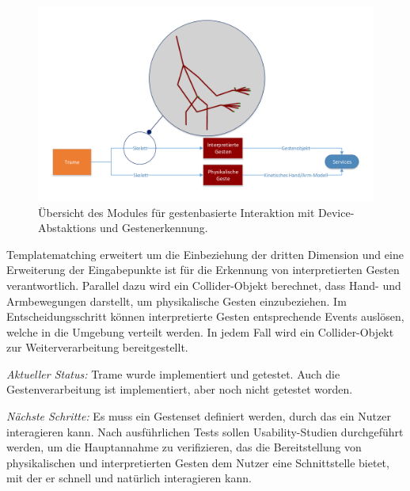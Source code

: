 \begin{figure}[H]
\includegraphics[width=\columnwidth]{figs/gesture_recognition_pipeline}
\caption{Übersicht des Modules für gestenbasierte Interaktion mit Device-Abstaktions und Gestenerkennung.}
\label{fig:gesture_recognition}
\end{figure}

Templatematching\cite{Kristensson:2012:CRO:2166966.2166983} erweitert um die Einbeziehung der dritten Dimension und eine
Erweiterung der Eingabepunkte ist für die Erkennung von interpretierten Gesten verantwortlich. Parallel dazu wird ein
Collider-Objekt berechnet, dass Hand- und Armbewegungen darstellt, um physikalische Gesten einzubeziehen. Im 
Entscheidungsschritt können interpretierte Gesten entsprechende Events auslösen, welche in die Umgebung verteilt werden.
In jedem Fall wird ein Collider-Objekt zur Weiterverarbeitung bereitgestellt. 


{\em Aktueller Status:} Trame wurde implementiert und getestet. Auch die Gestenverarbeitung ist implementiert, aber
noch nicht getestet worden. 


{\em Nächste Schritte:} Es muss ein Gestenset definiert werden, durch das ein Nutzer interagieren kann. Nach
ausführlichen Tests sollen Usability-Studien durchgeführt werden, um die Hauptannahme zu verifizieren, das die
Bereitstellung von physikalischen und interpretierten Gesten dem Nutzer eine Schnittstelle bietet,
mit der er schnell und natürlich interagieren kann.